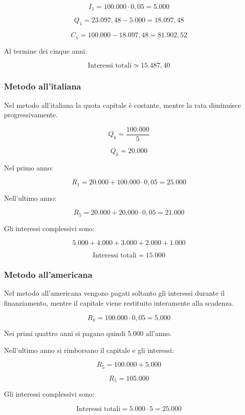 \[
I_1 = 100.000 \cdot 0{,}05 = 5.000
\]

\[
Q_1 = 23.097{,}48 - 5.000 = 18.097{,}48
\]

\[
C_1 = 100.000 - 18.097{,}48 = 81.902{,}52
\]

\noindent Al termine dei cinque anni:

\[
\boxed{\text{Interessi totali} \simeq 15.487{,}40}
\]

\subsubsection*{Metodo all'italiana}

\noindent Nel metodo all'italiana la quota capitale è costante, mentre la rata diminuisce progressivamente.

\[
Q_k = \frac{100.000}{5}
\]

\[
\boxed{Q_k = 20.000}
\]

\noindent Nel primo anno:

\[
R_1 = 20.000 + 100.000 \cdot 0{,}05
= 25.000
\]

\noindent Nell'ultimo anno:

\[
R_5 = 20.000 + 20.000 \cdot 0{,}05
= 21.000
\]

\noindent Gli interessi complessivi sono:

\[
5.000+4.000+3.000+2.000+1.000
\]

\[
\boxed{\text{Interessi totali} = 15.000}
\]

\subsubsection*{Metodo all'americana}

\noindent Nel metodo all'americana vengono pagati soltanto gli interessi durante il finanziamento, mentre il capitale viene restituito interamente alla scadenza.

\[
R_k = 100.000 \cdot 0{,}05
= 5.000
\]

\noindent Nei primi quattro anni si pagano quindi 5.000 all'anno.

\medskip

\noindent Nell'ultimo anno si rimborsano il capitale e gli interessi:

\[
R_5 = 100.000 + 5.000
\]

\[
\boxed{R_5 = 105.000}
\]

\noindent Gli interessi complessivi sono:

\[
\boxed{\text{Interessi totali} = 5.000 \cdot 5
= 25.000}
\]

